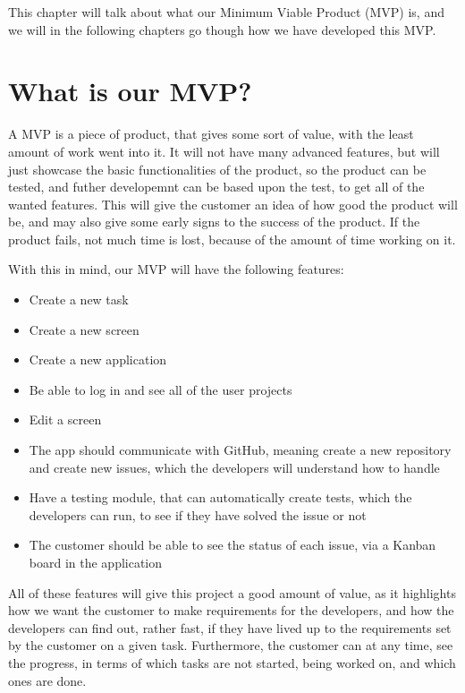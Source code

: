 This chapter will talk about what our Minimum Viable Product (MVP) is, and we will in the following chapters go though how we have developed this MVP.

\section{What is our MVP?}
A MVP is a piece of product, that gives some sort of value, with the least amount of work went into it.
It will not have many advanced features, but will just showcase the basic functionalities of the product, so the product can be tested, and futher developemnt can be based upon the test, to get all of the wanted features.
This will give the customer an idea of how good the product will be, and may also give some early signs to the success of the product. 
If the product fails, not much time is lost, because of the amount of time working on it. \cite{whatIsMVP}

With this in mind, our MVP will have the following features:

\begin{itemize}
    \item Create a new task
    \item Create a new screen
    \item Create a new application
    \item Be able to log in and see all of the user projects
    \item Edit a screen 
    \item The app should communicate with GitHub, meaning create a new repository and create new issues, which the developers will understand how to handle
    \item Have a testing module, that can automatically create tests, which the developers can run, to see if they have solved the issue or not
    \item The customer should be able to see the status of each issue, via a Kanban board in the application
\end{itemize}

All of these features will give this project a good amount of value, as it highlights how we want the customer to make requirements for the developers, and how the developers can find out, rather fast, if they have lived up to the requirements set by the customer on a given task.
Furthermore, the customer can at any time, see the progress, in terms of which tasks are not started, being worked on, and which ones are done.
 